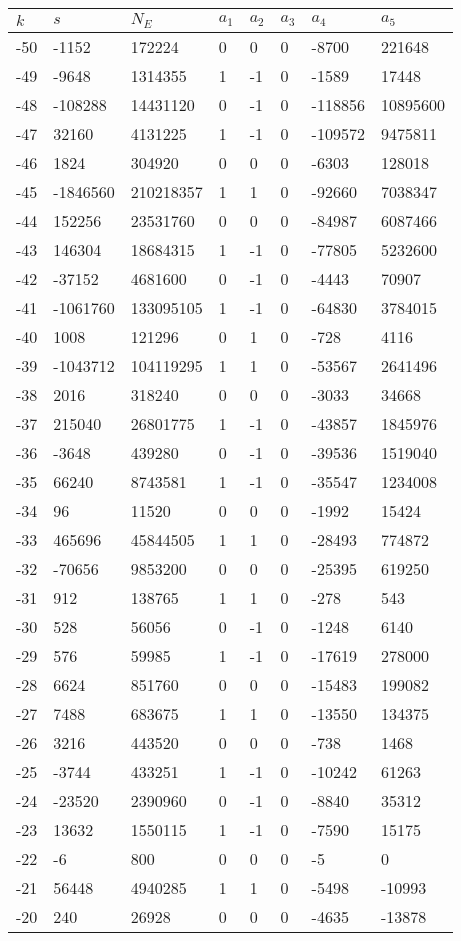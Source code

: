 \documentclass{amsart}
\begin{document}
\begin{longtable}{|l|l|l|lllll|}
\hline
$k$ & $s$ & $N_E$ & $a_1$ & $a_2$ & $a_3$ & $a_4$ & $a_5$\\
\hline
-50&-1152&172224&0&0&0&-8700&221648\\
-49&-9648&1314355&1&-1&0&-1589&17448\\
-48&-108288&14431120&0&-1&0&-118856&10895600\\
-47&32160&4131225&1&-1&0&-109572&9475811\\
-46&1824&304920&0&0&0&-6303&128018\\
-45&-1846560&210218357&1&1&0&-92660&7038347\\
-44&152256&23531760&0&0&0&-84987&6087466\\
-43&146304&18684315&1&-1&0&-77805&5232600\\
-42&-37152&4681600&0&-1&0&-4443&70907\\
-41&-1061760&133095105&1&-1&0&-64830&3784015\\
-40&1008&121296&0&1&0&-728&4116\\
-39&-1043712&104119295&1&1&0&-53567&2641496\\
-38&2016&318240&0&0&0&-3033&34668\\
-37&215040&26801775&1&-1&0&-43857&1845976\\
-36&-3648&439280&0&-1&0&-39536&1519040\\
-35&66240&8743581&1&-1&0&-35547&1234008\\
-34&96&11520&0&0&0&-1992&15424\\
-33&465696&45844505&1&1&0&-28493&774872\\
-32&-70656&9853200&0&0&0&-25395&619250\\
-31&912&138765&1&1&0&-278&543\\
-30&528&56056&0&-1&0&-1248&6140\\
-29&576&59985&1&-1&0&-17619&278000\\
-28&6624&851760&0&0&0&-15483&199082\\
-27&7488&683675&1&1&0&-13550&134375\\
-26&3216&443520&0&0&0&-738&1468\\
-25&-3744&433251&1&-1&0&-10242&61263\\
-24&-23520&2390960&0&-1&0&-8840&35312\\
-23&13632&1550115&1&-1&0&-7590&15175\\
-22&-6&800&0&0&0&-5&0\\
-21&56448&4940285&1&1&0&-5498&-10993\\
-20&240&26928&0&0&0&-4635&-13878\\

\end{longtable}
\end{document}
